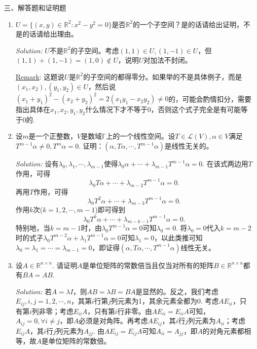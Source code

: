 \documentclass[a4[paper]{article}
\newcommand\R{\mathbb{R}}  %
\begin{document}
\noindent{}三、解答题和证明题
\begin{enumerate}[1.]
\item $U=\{(x,y)\in\R^2:x^2-y^2=0\}$是否$\R^2$的一个子空间？是的话请给出证明，不是的话请给出理由。

\smallskip

\noindent{}\emph{Solution:} $U$不是$\R^2$的子空间。考虑$(1,1)\in U, (1,-1)\in U$，但$(1,1)+(1,-1) = (1,0)\notin U$，说明$U$对加法不封闭。

\noindent{}\underline{Remark}: 这题说$U$是$\R^2$的子空间的都得零分。如果举的不是具体例子，而是$(x_1,x_2),(y_1,y_2)\in U$，然后说$(x_1+y_1)^2 -(x_2+y_2)^2=2(x_1y_1-x_2y_2)\ne 0$的，可能会酌情扣分，需要指出具体在$x_1,x_2,y_1,y_2$什么情况下才不等于0，否则这个式子完全是有可能等于0的.

\bigskip

\item 设$m$是一个正整数，$V$是数域$\mathbb{F}$上的一个线性空间。设$T\in\mathcal{L}(V),\alpha\in V$满足$T^{m-1}\alpha\ne 0, T^m\alpha=0$. 证明：$(\alpha,T\alpha,\cdots,T^{m-1}\alpha)$是线性无关的。

\smallskip

\noindent{}\emph{Solution:} 设有$\lambda_0,\lambda_1,\cdots,\lambda_{m-1}$使得$\lambda_0 \alpha+\cdots+\lambda_{m-1}T^{m-1}\alpha=0$. 在该式两边用$T$作用，可得
\[\lambda_0 T\alpha+\cdots+\lambda_{m-2}T^{m-1}\alpha=0.\]
再用$T$作用，可得
\[\lambda_0 T^2\alpha+\cdots+\lambda_{m-3}T^{m-1}\alpha=0.\]
作用$k$次($k=1,2,\cdots,m-1$)即可得到
\[\lambda_0 T^k\alpha+\cdots+\lambda_{m-k-1}T^{m-1}\alpha=0.\]
特别地，当$k=m-1$时，由$\lambda_0T^{m-1}\alpha=0$可知$\lambda_0=0$. 将$\lambda_0=0$代入$k=m-2$时的式子$\lambda_0T^{m-2}\alpha+\lambda_1T^{m-1}\alpha=0$可知$\lambda_1=0$，以此类推可知$\lambda_0=\lambda_1=\cdots=\lambda_{m-1}=0$，即证得$(\alpha,T\alpha,\cdots,T^{m-1}\alpha)$线性无关。

\bigskip

\item 设$A\in\R^{n\times n}$. 请证明$A$是单位矩阵的常数倍当且仅当对所有的矩阵$B\in \R^{n\times n}$都有$BA=AB$.

\smallskip

\noindent\emph{Solution:} 若$A=\lambda I$，则$AB=\lambda B= BA$是显然的。反之，我们考虑$E_{ij},i,j=1,2,\cdots, n$，其第$i$行第$j$列元素为1，其余元素全都为0. 考虑$AE_{ii}$，只有第$i$列非零；考虑$E_{ii}A$，只有第$i$行非零。由$AE_{ii}=E_{ii}A$可知，$A_{ij}=0,\forall i\ne j$，即$A$必须是对角阵。再考虑$AE_{ij}$，其$i$行$j$列元素为$A_{ii}$；考虑$E_{ij}A$，其$i$行$j$列元素为$A_{jj}$. 由$AE_{ij}=E_{ij}A$可知$A_{ii}=A_{jj}$，即$A$的对角元素都相等，故$A$是单位矩阵的常数倍。


\end{enumerate}
\end{document}
